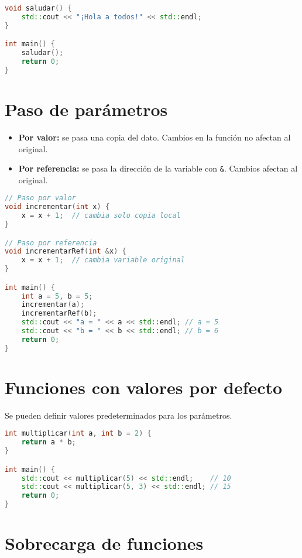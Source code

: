 \documentclass[a4paper]{article}
\begin{document}
\begin{lstlisting}[language=C++]
void saludar() {
    std::cout << "¡Hola a todos!" << std::endl;
}

int main() {
    saludar();
    return 0;
}
\end{lstlisting}

\section{Paso de parámetros}

\begin{itemize}
    \item \textbf{Por valor:} se pasa una copia del dato. Cambios en la función no afectan al original.
    \item \textbf{Por referencia:} se pasa la dirección de la variable con \texttt{\&}. Cambios afectan al original.
\end{itemize}

\begin{lstlisting}[language=C++]
// Paso por valor
void incrementar(int x) {
    x = x + 1;  // cambia solo copia local
}

// Paso por referencia
void incrementarRef(int &x) {
    x = x + 1;  // cambia variable original
}

int main() {
    int a = 5, b = 5;
    incrementar(a);
    incrementarRef(b);
    std::cout << "a = " << a << std::endl; // a = 5
    std::cout << "b = " << b << std::endl; // b = 6
    return 0;
}
\end{lstlisting}

\section{Funciones con valores por defecto}

Se pueden definir valores predeterminados para los parámetros.

\begin{lstlisting}[language=C++]
int multiplicar(int a, int b = 2) {
    return a * b;
}

int main() {
    std::cout << multiplicar(5) << std::endl;    // 10
    std::cout << multiplicar(5, 3) << std::endl; // 15
    return 0;
}
\end{lstlisting}

\section{Sobrecarga de funciones}
\end{document}
